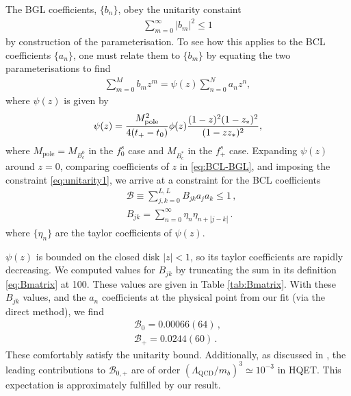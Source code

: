 The BGL coefficients, $\{ b_n \}$, obey the unitarity constaint
\begin{align}
  \sum_{m=0}^{\infty} |b_m|^2 \leq 1
  \label{eq:unitarity1}
\end{align}
by construction of the parameterisation. To see how this applies to the BCL coefficients $\{ a_n \}$, one must relate them to $\{ b_m \}$ by equating the two parameterisations to find
\begin{align}
  \label{eq:BCL-BGL}
  \sum^M_{m=0} b_m z^m = \psi(z) \sum_{n=0}^N a_n z^n,
\end{align}
where $\psi(z)$ is given by
\begin{align}
  \psi(z) = { M_{\text{pole}}^2 \over 4(t_+ - t_0) } \phi(z) {(1-z)^2(1-z_*)^2\over (1-zz_*)^2 },
\end{align}
where $M_{\text{pole}}=M_{B_c^0}$ in the $f^s_0$ case and $M_{B_c^*}$ in the $f^s_+$ case. Expanding $\psi(z)$ around $z=0$, comparing coefficients of $z$ in \eqref{eq:BCL-BGL}, and imposing the constraint \eqref{eq:unitarity1}, we arrive at a constraint for the BCL coefficients
\begin{align}
    \label{eq:unitarity2}
    &\mathcal{B} \equiv \sum_{j,k=0}^{L,L} B_{jk} a_j a_k \leq 1\,, \\
    &B_{jk} = \sum_{n=0}^{\infty} \eta_n \eta_{n+|j-k|}\,.
        \label{eq:Bmatrix}
\end{align}
where $\{\eta_n\}$ are the taylor coefficients of $\psi(z)$.

$\psi(z)$ is bounded on the closed disk $|z|<1$, so its taylor coefficients are rapidly decreasing. We computed values for $B_{jk}$ by truncating the sum in its definition \eqref{eq:Bmatrix} at 100. These values are given in Table \ref{tab:Bmatrix}. With these $B_{jk}$ values, and the $a_n$ coefficients at the physical point from our fit (via the direct method), we find
\begin{align}
  \nonumber
  \mathcal{B}_0 = 0.00066(64)\,,
  \\ \mathcal{B}_+ = 0.0244(60)\,.
  \nonumber
\end{align}
These comfortably satisfy the unitarity bound. Additionally, as discussed in \cite{BECHER200661}, the leading contributions to $\mathcal{B}_{0,+}$ are of order $(\Lambda_{\text{QCD}}/m_b)^3 \simeq 10^{-3}$ in HQET. This expectation is approximately fulfilled by our result.

